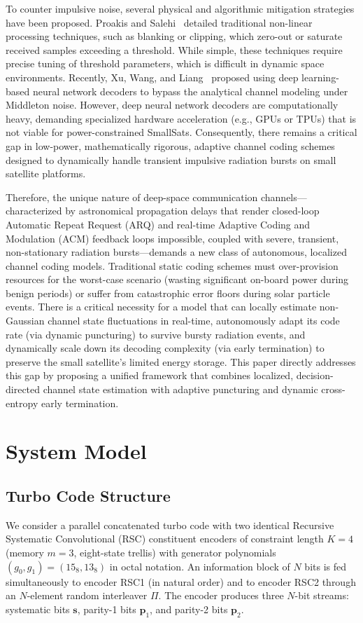 \documentclass[journal,twocolumn]{IEEEtran}
\begin{document}
To counter impulsive noise, several physical and algorithmic mitigation strategies have been proposed. Proakis and Salehi~\cite{proakis2008digital} detailed traditional non-linear processing techniques, such as blanking or clipping, which zero-out or saturate received samples exceeding a threshold. While simple, these techniques require precise tuning of threshold parameters, which is difficult in dynamic space environments. Recently, Xu, Wang, and Liang~\cite{xu2020deep} proposed using deep learning-based neural network decoders to bypass the analytical channel modeling under Middleton noise. However, deep neural network decoders are computationally heavy, demanding specialized hardware acceleration (e.g., GPUs or TPUs) that is not viable for power-constrained SmallSats. Consequently, there remains a critical gap in low-power, mathematically rigorous, adaptive channel coding schemes designed to dynamically handle transient impulsive radiation bursts on small satellite platforms.

Therefore, the unique nature of deep-space communication channels—characterized by astronomical propagation delays that render closed-loop Automatic Repeat Request (ARQ) and real-time Adaptive Coding and Modulation (ACM) feedback loops impossible, coupled with severe, transient, non-stationary radiation bursts—demands a new class of autonomous, localized channel coding models. Traditional static coding schemes must over-provision resources for the worst-case scenario (wasting significant on-board power during benign periods) or suffer from catastrophic error floors during solar particle events. There is a critical necessity for a model that can locally estimate non-Gaussian channel state fluctuations in real-time, autonomously adapt its code rate (via dynamic puncturing) to survive bursty radiation events, and dynamically scale down its decoding complexity (via early termination) to preserve the small satellite's limited energy storage. This paper directly addresses this gap by proposing a unified framework that combines localized, decision-directed channel state estimation with adaptive puncturing and dynamic cross-entropy early termination.

\section{System Model}
\label{sec:system}

\subsection{Turbo Code Structure}
We consider a parallel concatenated turbo code with two identical
Recursive Systematic Convolutional (RSC) constituent encoders of
constraint length $K=4$ (memory $m=3$, eight-state trellis) with
generator polynomials $(g_0, g_1) = (15_8, 13_8)$ in octal notation.
An information block of $N$ bits is fed simultaneously to encoder RSC1
(in natural order) and to encoder RSC2 through an $N$-element random
interleaver $\Pi$.  The encoder produces three $N$-bit streams:
systematic bits $\mathbf{s}$, parity-1 bits $\mathbf{p}_1$, and
parity-2 bits $\mathbf{p}_2$.
\end{document}
